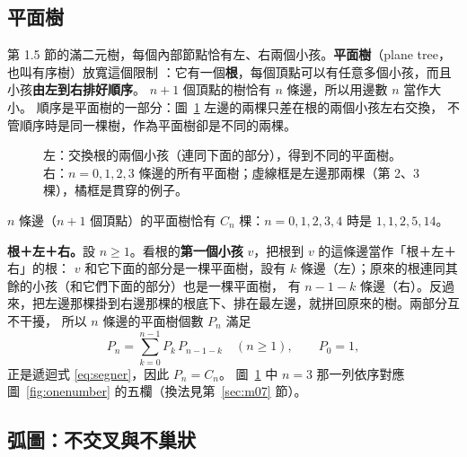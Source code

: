 

\subsection{平面樹}\label{sec:m05}

第 1.5 節的滿二元樹，每個內部節點恰有左、右兩個小孩。\textbf{平面樹}（plane tree，也叫有序樹）放寬這個限制
：它有一個\textbf{根}，每個頂點可以有任意多個小孩，而且小孩\textbf{由左到右排好順序}。
$n+1$ 個頂點的樹恰有 $n$ 條邊，所以用邊數 $n$ 當作大小。
順序是平面樹的一部分：圖~\ref{fig:m05-trees} 左邊的兩棵只差在根的兩個小孩左右交換，
不管順序時是同一棵樹，作為平面樹卻是不同的兩棵。

\begin{figure}[H]
\centering
\FigMfiveTrees
\caption{左：交換根的兩個小孩（連同下面的部分），得到不同的平面樹。
右：$n=0,1,2,3$ 條邊的所有平面樹；虛線框是左邊那兩棵（第 2、3 棵），\textcolor{cTop}{橘框}是貫穿的例子。}
\label{fig:m05-trees}
\end{figure}

\begin{thmbox}[平面樹]
$n$ 條邊（$n+1$ 個頂點）的平面樹恰有 $C_n$ 棵：$n=0,1,2,3,4$ 時是 $1,1,2,5,14$。
\end{thmbox}

\textbf{根＋左＋右。}設 $n\ge1$。看根的\textbf{第一個小孩} $v$，把根到 $v$ 的這條邊當作「根＋左＋右」的根：
$v$ 和它下面的部分是一棵平面樹，設有 $k$ 條邊（左）；原來的根連同其餘的小孩（和它們下面的部分）也是一棵平面樹，
有 $n-1-k$ 條邊（右）。反過來，把左邊那棵掛到右邊那棵的根底下、排在最左邊，就拼回原來的樹。兩部分互不干擾，
所以 $n$ 條邊的平面樹個數 $P_n$ 滿足
\[
P_n=\sum_{k=0}^{n-1}P_k\,P_{n-1-k}\quad(n\ge1),\qquad P_0=1,
\]
正是遞迴式 \eqref{eq:segner}，因此 $P_n=C_n$。
圖~\ref{fig:m05-trees} 中 $n=3$ 那一列依序對應圖~\ref{fig:onenumber} 的五欄（換法見第~\ref{sec:m07} 節）。

\subsection{弧圖：不交叉與不巢狀}\label{sec:m06}

